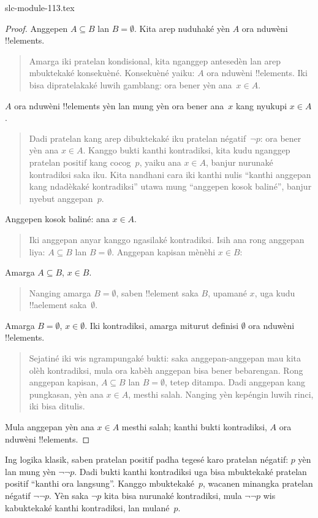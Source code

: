 \begin{filecontents*}[overwrite]{slc-module-113.tex}
\begin{proof}
  Anggepen $A \subseteq B$ lan $B = \emptyset$.
  Kita arep nuduhaké yèn $A$ ora nduwèni !!{element}s.
  \begin{quote}
    Amarga iki pratelan kondisional, kita nganggep
    antesedèn lan arep mbuktekaké konsekuèné.
    Konsekuèné yaiku: $A$ ora nduwèni !!{element}s.
    Iki bisa dipratelakaké luwih gamblang: ora bener
    yèn ana~$x \in A$.
  \end{quote}
  $A$ ora nduwèni !!{element}s yèn lan mung yèn
  ora bener ana~$x$ kang nyukupi $x \in A$.
  \begin{quote}
    Dadi pratelan kang arep dibuktekaké iku pratelan
    négatif~$\lnot p$: ora bener yèn ana $x \in A$.
    Kanggo bukti kanthi kontradiksi, kita kudu nganggep
    pratelan positif kang cocog~$p$, yaiku ana
    $x \in A$, banjur nurunaké kontradiksi saka iku.
    Kita nandhani cara iki kanthi nulis
    ``kanthi anggepan kang ndadèkaké kontradiksi''
    utawa mung ``anggepen kosok baliné'', banjur
    nyebut anggepan~$p$.
  \end{quote}
  Anggepen kosok baliné: ana $x \in A$.
  \begin{quote}
    Iki anggepan anyar kanggo ngasilaké kontradiksi.
    Isih ana rong anggepan liya: $A \subseteq B$
    lan $B = \emptyset$. Anggepan kapisan mènèhi
    $x \in B$:
  \end{quote}
  Amarga $A \subseteq B$, $x \in B$.
  \begin{quote}
    Nanging amarga $B = \emptyset$, saben !!{element}
    saka $B$, upamané $x$, uga kudu !!a{element}
    saka~$\emptyset$.
  \end{quote}
  Amarga $B = \emptyset$, $x \in \emptyset$.
  Iki kontradiksi, amarga miturut definisi $\emptyset$
  ora nduwèni !!{element}s.
  \begin{quote}
    Sejatiné iki wis ngrampungaké bukti: saka
    anggepan-anggepan mau kita olèh kontradiksi,
    mula ora kabèh anggepan bisa bener bebarengan.
    Rong anggepan kapisan, $A \subseteq B$ lan
    $B = \emptyset$, tetep ditampa. Dadi anggepan
    kang pungkasan, yèn ana $x \in A$, mesthi salah.
    Nanging yèn kepéngin luwih rinci, iki bisa ditulis.
  \end{quote}
  Mula anggepan yèn ana $x \in A$ mesthi salah;
  kanthi bukti kontradiksi, $A$ ora nduwèni !!{element}s.
\end{proof}

Ing logika klasik, saben pratelan positif padha tegesé karo pratelan
négatif: $p$ yèn lan mung yèn $\lnot\lnot p$.
Dadi bukti kanthi kontradiksi uga bisa mbuktekaké
pratelan positif ``kanthi ora langsung''.
Kanggo mbuktekaké~$p$, wacanen minangka
pratelan négatif $\lnot\lnot p$. Yèn saka
$\lnot p$ kita bisa nurunaké kontradiksi,
mula $\lnot\lnot p$ wis kabuktekaké kanthi
kontradiksi, lan mulané~$p$.


\end{filecontents*}
